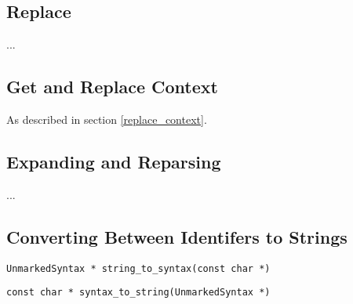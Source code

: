\documentclass[12pt,english,letterpaper]{article}
\begin{document}
\subsection{Replace}

...

\subsection{Get and Replace Context}

As described in section \ref{replace_context}.

\subsection{Expanding and Reparsing}

...

\subsection{Converting Between Identifers to Strings}

\begin{itemize*}
\item \verb/UnmarkedSyntax * string_to_syntax(const char *)/
\item \verb/const char * syntax_to_string(UnmarkedSyntax *)/
\end{itemize*}
\end{document}
